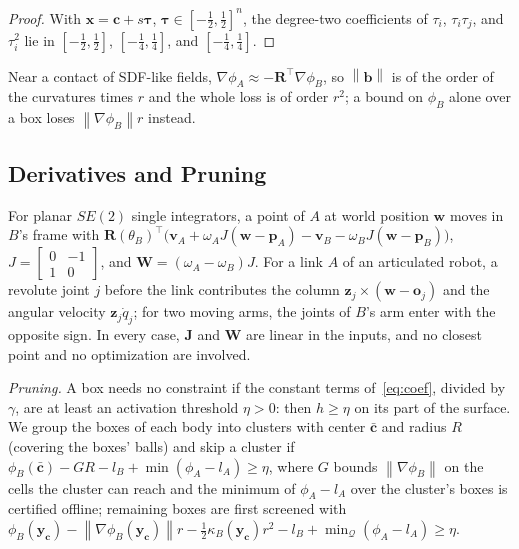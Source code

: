 \documentclass[journal]{IEEEtran}
\theoremstyle{definition}
\newcommand{\norm}[1]{\left\lVert #1\right\rVert}
\newcommand{\Rot}{\mathbf{R}}
\begin{document}
\begin{proof}
With $\mathbf x=\mathbf c+s\boldsymbol\tau$, $\boldsymbol\tau\in[-\frac12,\frac12]^n$, the degree-two
coefficients of $\tau_i$, $\tau_i\tau_j$, and $\tau_i^2$ lie in $[-\frac12,\frac12]$,
$[-\frac14,\frac14]$, and $[-\frac14,\frac14]$.
\end{proof}
Near a contact of SDF-like fields, $\nabla\phi_A\approx-\Rot^\top\nabla\phi_B$, so $\norm{\mathbf b}$ is
of the order of the curvatures times $r$ and the whole loss is of order $r^2$; a bound on $\phi_B$
alone over a box loses $\norm{\nabla\phi_B}r$ instead.

\subsection{Derivatives and Pruning}\label{sec:cover-der}
For planar $SE(2)$ single integrators, a point of $A$ at world position $\mathbf w$ moves in $B$'s frame
with $\Rot(\theta_B)^{\!\top}\big(\mathbf v_A+\omega_AJ(\mathbf w-\mathbf p_A)-\mathbf v_B-\omega_BJ(\mathbf w-\mathbf p_B)\big)$,
$J=\left[\begin{smallmatrix}0&-1\\1&0\end{smallmatrix}\right]$, and
$\mathbf W=(\omega_A-\omega_B)J$. For a link $A$ of an articulated robot, a revolute joint $j$ before
the link contributes the column $\mathbf z_j\times(\mathbf w-\mathbf o_j)$ and the angular velocity
$\mathbf z_j\dot q_j$; for two moving arms, the joints of $B$'s arm enter with the opposite sign. In
every case, $\mathbf J$ and $\mathbf W$ are linear in the inputs, and no closest point and no
optimization are involved.

\emph{Pruning.} A box needs no constraint if the constant terms of~\eqref{eq:coef}, divided by
$\gamma$, are at least an activation threshold $\eta>0$: then $h\ge\eta$ on its part of the surface.
We group the boxes of each body into clusters with center $\bar{\mathbf c}$ and radius $R$ (covering
the boxes' balls) and skip a cluster if $\phi_B(\bar{\mathbf c})-GR-l_B+\min(\phi_A-l_A)\ge\eta$,
where $G$ bounds $\norm{\nabla\phi_B}$ on the cells the cluster can reach and the minimum of
$\phi_A-l_A$ over the cluster's boxes is certified offline; remaining boxes are first screened with
$\phi_B(\mathbf y_{\mathbf c})-\norm{\nabla\phi_B(\mathbf y_{\mathbf c})}r-\frac12\kappa_B(\mathbf y_{\mathbf c})r^2-l_B+\min_{\mathcal Q}(\phi_A-l_A)\ge\eta$.
\end{document}
